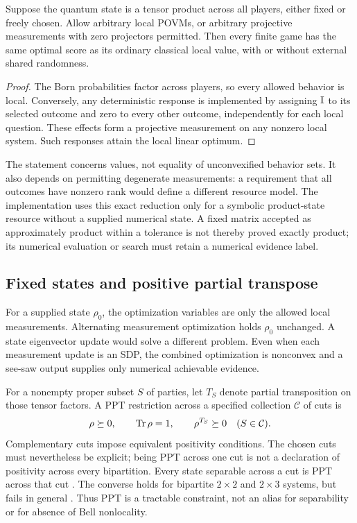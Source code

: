 \begin{proposition}
\label{prop:productvalue}
Suppose the quantum state is a tensor product across all players, either fixed
or freely chosen. Allow arbitrary local POVMs, or arbitrary projective
measurements with zero projectors permitted. Then every finite game has the
same optimal score as its ordinary classical local value, with or without
external shared randomness.
\end{proposition}
\begin{proof}
The Born probabilities factor across players, so every allowed behavior is
local. Conversely, any deterministic response is implemented by assigning
$\mathbb I$ to its selected outcome and zero to every other outcome, independently
for each local question. These effects form a projective measurement on any
nonzero local system. Such responses attain the local linear optimum.
\end{proof}
The statement concerns values, not equality of unconvexified behavior sets.
It also depends on permitting degenerate measurements: a requirement that all
outcomes have nonzero rank would define a different resource model.
The implementation uses this exact reduction only for a symbolic product-state
resource without a supplied numerical state. A fixed matrix accepted as
approximately product within a tolerance is not thereby proved exactly product;
its numerical evaluation or search must retain a numerical evidence label.

\subsection{Fixed states and positive partial transpose}
For a supplied state $\rho_0$, the optimization variables are only the allowed
local measurements. Alternating measurement optimization holds $\rho_0$
unchanged. A state eigenvector update would solve a different problem. Even
when each measurement update is an SDP, the combined optimization is
nonconvex and a see-saw output supplies only numerical achievable evidence.

For a nonempty proper subset $S$ of parties, let $T_S$ denote partial
transposition on those tensor factors. A PPT restriction across a specified
collection $\mathcal C$ of cuts is
\[
 \rho\succeq0,\qquad \operatorname{Tr}\rho=1,\qquad
 \rho^{T_S}\succeq0\quad(S\in\mathcal C).
\]
Complementary cuts impose equivalent positivity conditions. The chosen cuts
must nevertheless be explicit; being PPT across one cut is not a declaration
of positivity across every bipartition. Every state separable across a cut
is PPT across that cut \cite{peres1996}. The converse holds for bipartite
$2\times2$ and $2\times3$ systems, but fails in general
\cite{horodecki1996}. Thus PPT is a tractable constraint, not an alias for
separability or for absence of Bell nonlocality.

